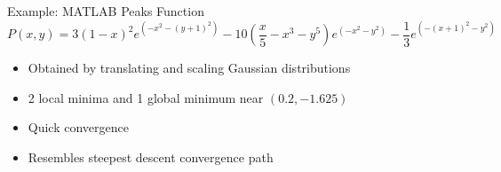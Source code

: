 \documentclass[
	style=aggie,
	mode=present,
	size=10pt,
	paper=screen,
	orient=landscape,
	display=slides,
]{powerdot}
\begin{document}
\begin{wideslide}[toc=MATLAB Peaks,bm=MATLAB Peaks]
{Example: MATLAB Peaks Function}
	\vfill
		\begin{equation*}
 			P(x,y)=
			3\left(1-x\right)^2
			e^{\left(-x^{2}-\left(y+1\right)^{2}\right)}-
			10\left(\frac{x}{5}-x^{3}-y^{5}\right)e^
			{\left(-x^{2}-y^{2}\right)}-
			\frac{1}{3}e^{\left(-\left(x+1\right)^{2}-y^{2}\right)}
		\end{equation*}
	\vfill
	\centering
	\begin{figure}[htbp]
	\end{figure}
	\vfill
	\begin{itemize}
 		\item Obtained by translating and scaling Gaussian distributions
 		\vspace{1mm}
 		\item 2 local minima and 1 global minimum near $(0.2,-1.625)$
 		\vspace{1mm}
 		\item Quick convergence
		\vspace{1mm}
		\item Resembles steepest descent convergence path
	\end{itemize}
	\vfill \strut
\end{wideslide}
	
\end{document}
